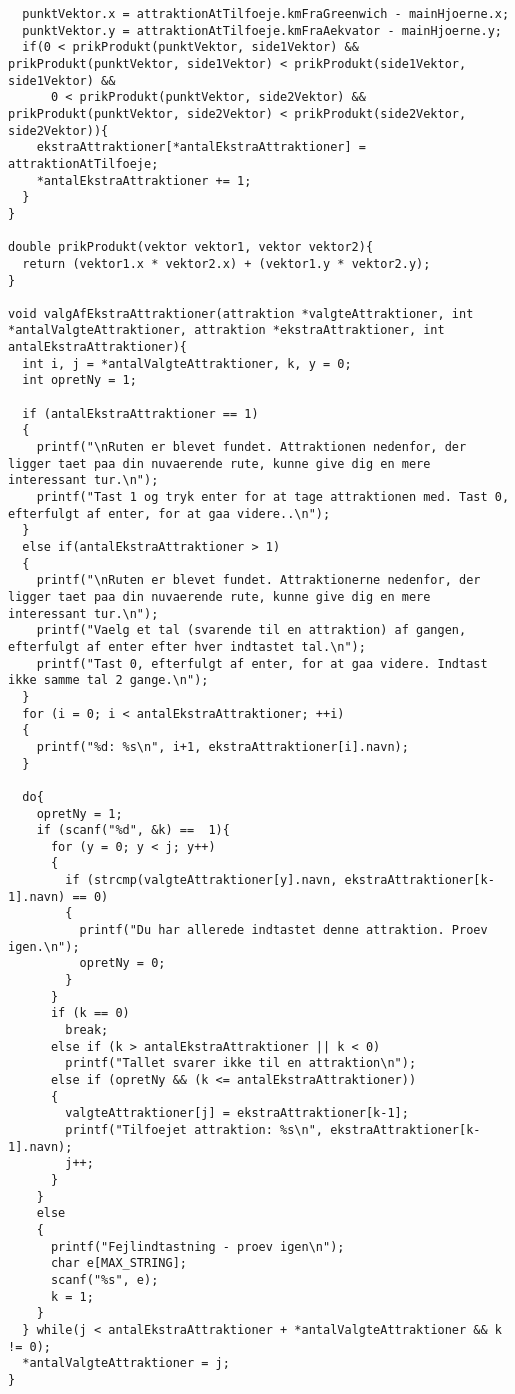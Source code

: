 \begin{lstlisting}
  punktVektor.x = attraktionAtTilfoeje.kmFraGreenwich - mainHjoerne.x;
  punktVektor.y = attraktionAtTilfoeje.kmFraAekvator - mainHjoerne.y;
  if(0 < prikProdukt(punktVektor, side1Vektor) && prikProdukt(punktVektor, side1Vektor) < prikProdukt(side1Vektor, side1Vektor) &&
      0 < prikProdukt(punktVektor, side2Vektor) && prikProdukt(punktVektor, side2Vektor) < prikProdukt(side2Vektor, side2Vektor)){
    ekstraAttraktioner[*antalEkstraAttraktioner] = attraktionAtTilfoeje;
    *antalEkstraAttraktioner += 1;
  }
}

double prikProdukt(vektor vektor1, vektor vektor2){
  return (vektor1.x * vektor2.x) + (vektor1.y * vektor2.y);
}

void valgAfEkstraAttraktioner(attraktion *valgteAttraktioner, int *antalValgteAttraktioner, attraktion *ekstraAttraktioner, int antalEkstraAttraktioner){
  int i, j = *antalValgteAttraktioner, k, y = 0;
  int opretNy = 1;

  if (antalEkstraAttraktioner == 1)
  {
    printf("\nRuten er blevet fundet. Attraktionen nedenfor, der ligger taet paa din nuvaerende rute, kunne give dig en mere interessant tur.\n");
    printf("Tast 1 og tryk enter for at tage attraktionen med. Tast 0, efterfulgt af enter, for at gaa videre..\n");
  }
  else if(antalEkstraAttraktioner > 1)
  {
    printf("\nRuten er blevet fundet. Attraktionerne nedenfor, der ligger taet paa din nuvaerende rute, kunne give dig en mere interessant tur.\n");
    printf("Vaelg et tal (svarende til en attraktion) af gangen, efterfulgt af enter efter hver indtastet tal.\n");
    printf("Tast 0, efterfulgt af enter, for at gaa videre. Indtast ikke samme tal 2 gange.\n");
  }
  for (i = 0; i < antalEkstraAttraktioner; ++i)
  {
    printf("%d: %s\n", i+1, ekstraAttraktioner[i].navn);
  }

  do{
    opretNy = 1;
    if (scanf("%d", &k) ==  1){
      for (y = 0; y < j; y++)
      {
        if (strcmp(valgteAttraktioner[y].navn, ekstraAttraktioner[k-1].navn) == 0)
        {
          printf("Du har allerede indtastet denne attraktion. Proev igen.\n");
          opretNy = 0;
        }
      }
      if (k == 0)
        break;
      else if (k > antalEkstraAttraktioner || k < 0)
        printf("Tallet svarer ikke til en attraktion\n");
      else if (opretNy && (k <= antalEkstraAttraktioner))
      {
        valgteAttraktioner[j] = ekstraAttraktioner[k-1];
        printf("Tilfoejet attraktion: %s\n", ekstraAttraktioner[k-1].navn);
        j++;
      }
    }
    else
    {
      printf("Fejlindtastning - proev igen\n");
      char e[MAX_STRING];
      scanf("%s", e);
      k = 1;
    }
  } while(j < antalEkstraAttraktioner + *antalValgteAttraktioner && k != 0);
  *antalValgteAttraktioner = j;
}


\end{lstlisting}
